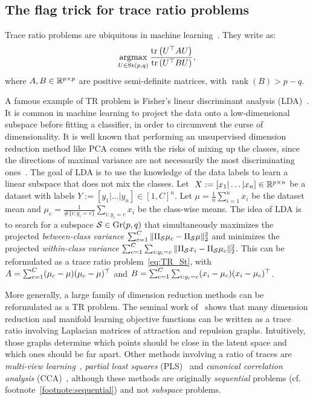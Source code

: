 \subsection{The flag trick for trace ratio problems}\label{subsec:TR}
Trace ratio problems are ubiquitous in machine learning~\citep{ngo_trace_2012}. They write as:
\begin{equation}\label{eq:TR_St}
\argmax{U \in \St(p, q)} \frac{\tr{U\T A U}}{\tr{U\T B U}},
\end{equation}
where $A, B \in \R^{p\times p}$ are positive semi-definite matrices, with $\operatorname{rank}(B) > p - q$.

A famous example of TR problem is Fisher's linear discriminant analysis (LDA)~\citep{fisher_use_1936,belhumeur_eigenfaces_1997}.
It is common in machine learning to project the data onto a low-dimensional subspace before fitting a classifier, in order to circumvent the curse of dimensionality. It is well known that performing an unsupervised dimension reduction method like PCA comes with the risks of mixing up the classes, since the directions of maximal variance are not necessarily the most discriminating ones~\citep{chang_using_1983}. The goal of LDA is to use the knowledge of the data labels to learn a linear subspace that does not mix the classes.
Let $~{X := [x_1|\dots|x_n] \in \R^{p\times n}}$ be a dataset with labels $Y := [y_1|\dots|y_n] \in {[1, C]}^n$. Let $\mu = \frac{1}{n} \sum_{i=1}^n x_i$ be the dataset mean and $\mu_c = \frac{1}{\#\{i : y_i=c\}}\sum_{i : y_i=c} x_i$ be the class-wise means. 
The idea of LDA is to search for a subspace $\S \in \Gr(p, q)$ that simultaneously maximizes the projected \textit{between-class variance} $\sum_{c=1}^C \|\Pi_\S \mu_c - \Pi_\S \mu\|_2^2$ and minimizes the projected \textit{within-class variance} $\sum_{c=1}^C \sum_{i : y_i = c} \|\Pi_\S x_i - \Pi_\S \mu_c\|_2^2$. This can be reformulated as a trace ratio problem~\eqref{eq:TR_St}, with $A = \sum_{c=1}^C (\mu_c - \mu) (\mu_c - \mu)\T$ and $B = \sum_{c=1}^C \sum_{i : y_i = c} (x_i - \mu_c) (x_i - \mu_c)\T$.


More generally, a large family of dimension reduction methods can be reformulated as a TR problem. The seminal work of~\citet{yan_graph_2007} shows that many dimension reduction and manifold learning objective functions can be written as a trace ratio involving Laplacian matrices of attraction and repulsion graphs. Intuitively, those graphs determine which points should be close in the latent space and which ones should be far apart.
Other methods involving a ratio of traces are \textit{multi-view learning}~\citep{wang_trace_2023}, \textit{partial least squares} (PLS)~\citep{geladi_partial_1986,barker_partial_2003} and \textit{canonical correlation analysis} (CCA)~\citep{hardoon_canonical_2004}, although these methods are originally \textit{sequential} problems (cf. footnote~\ref{footnote:sequential}) and not \textit{subspace} problems.

